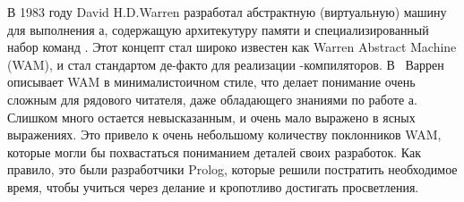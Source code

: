 
\secdown

В 1983 году David H.D.Warren разработал абстрактную (виртуальную) машину для
выполнения \prolog а, содержащую архитекутуру памяти и специализированный набор
команд \cite{War83}. Этот концепт стал широко известен как Warren Abstract
Machine (WAM), и стал стандартом де-факто для реализации \prolog-компиляторов.
В \cite{War83}\ Варрен описывает WAM в минималистоичном стиле, что делает
понимание очень сложным для рядового читателя, даже обладающего знаниями по
работе \prolog а. Слишком много остается невысказанным, и очень мало выражено в
ясных выражениях. Это привело к очень
небольшому количеству поклонников WAM, которые могли бы похвастаться пониманием
деталей своих разработок.  Как правило, это были разработчики Prolog, которые
решили постратить необходимое время, чтобы учиться через делание и кропотливо
достигать просветления.





\secup
